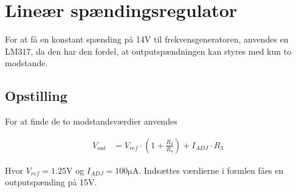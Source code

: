 \section{Lineær spændingsregulator}\label{sec:lm317}
For at få en konstant spænding på 14\si{\volt} til frekvensgeneratoren, anvendes en LM317, da den har den fordel, at outputspændningen kan styres med kun to modstande.


\subsection{Opstilling}


For at finde de to modstandsværdier anvendes

\begin{align}
	V_{out} & = V_{ref} \cdot \left( 1 + \frac{R_3}{R_4} \right) + I_{ADJ} \cdot R_3
\end{align}

Hvor $V_{ref} = 1.25\si{\volt}$ og $I_{ADJ} = 100\si{\micro\ampere}$. Indsættes værdierne i formlen fåes en outputspænding på 15\si{\volt}.